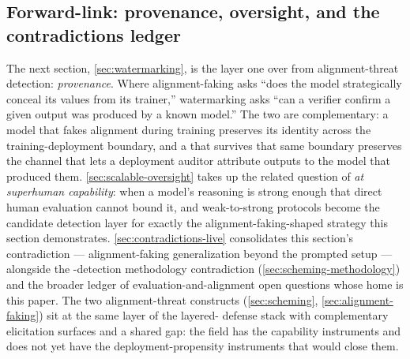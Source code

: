 \subsection{Forward-link: provenance, oversight, and the contradictions ledger}
\label{sec:alignment-faking-forward}

The next section, \cref{sec:watermarking}, is the layer one over from
alignment-threat detection: \emph{provenance}. Where alignment-faking
asks ``does the model strategically conceal its values from its
trainer,'' watermarking asks ``can a verifier confirm a given output
was produced by a known model.'' The two are complementary: a
model that fakes alignment during training preserves its identity
across the training-deployment boundary, and a  that survives
that same boundary preserves the channel that lets a deployment auditor
attribute outputs to the model that produced them. \cref{sec:scalable-oversight}
takes up the related question of \emph{ at
superhuman capability}: when a model's reasoning is strong enough
that direct human evaluation cannot bound it,  and
weak-to-strong protocols become the candidate detection layer for
exactly the alignment-faking-shaped strategy this section
demonstrates. \cref{sec:contradictions-live} consolidates this
section's contradiction --- alignment-faking generalization beyond
the prompted setup --- alongside the -detection methodology
contradiction (\cref{sec:scheming-methodology}) and the broader
ledger of evaluation-and-alignment open questions whose home is this
paper. The two alignment-threat constructs (\cref{sec:scheming},
\cref{sec:alignment-faking}) sit at the same layer of the layered-
defense stack with complementary elicitation surfaces and a shared
gap: the field has the capability instruments and does not yet have
the deployment-propensity instruments that would close them.
